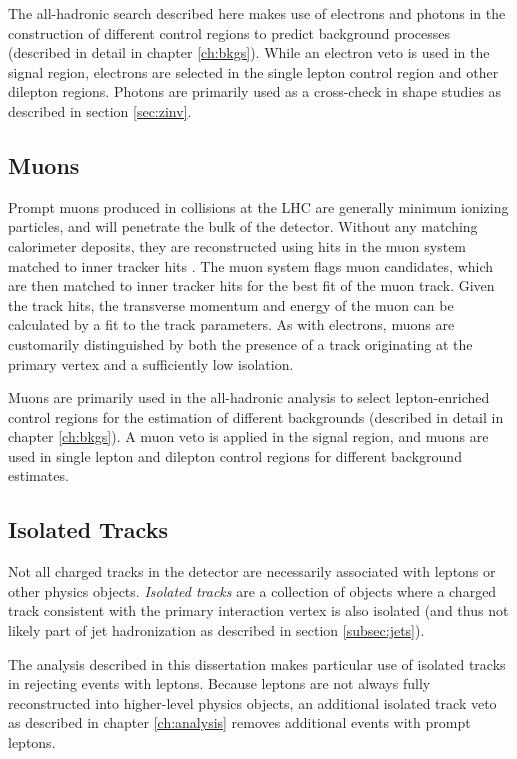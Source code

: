 The all-hadronic search described here makes use of electrons and photons in the construction of different control regions to predict background processes (described in detail in chapter \ref{ch:bkgs}). While an electron veto is used in the signal region, electrons are selected in the single lepton control region and other dilepton regions. Photons are primarily used as a cross-check in \mttwo shape studies as described in section \ref{sec:zinv}.

\subsection{Muons}
\label{subsec:muons}
Prompt muons produced in collisions at the LHC are generally minimum ionizing particles, and will penetrate the bulk of the detector. Without any matching calorimeter deposits, they are reconstructed using hits in the muon system matched to inner tracker hits \cite{Chatrchyan:2009ae}. The muon system flags muon candidates, which are then matched to inner tracker hits for the best fit of the muon track. Given the track hits, the transverse momentum and energy of the muon can be calculated by a fit to the track parameters. As with electrons, muons are customarily distinguished by both the presence of a track originating at the primary vertex and a sufficiently low isolation.

Muons are primarily used in the all-hadronic analysis to select lepton-enriched control regions for the estimation of different backgrounds (described in detail in chapter \ref{ch:bkgs}). A muon veto is applied in the signal region, and muons are used in single lepton and dilepton control regions for different background estimates.

\subsection{Isolated Tracks}
\label{subsec:isotrack}
Not all charged tracks in the detector are necessarily associated with leptons or other physics objects. {\it Isolated tracks} are a collection of objects where a charged track consistent with the primary interaction vertex is also isolated (and thus not likely part of jet hadronization as described in section \ref{subsec:jets}).

The analysis described in this dissertation makes particular use of isolated tracks in rejecting events with leptons. Because leptons are not always fully reconstructed into higher-level physics objects, an additional isolated track veto as described in chapter \ref{ch:analysis} removes additional events with prompt leptons.

